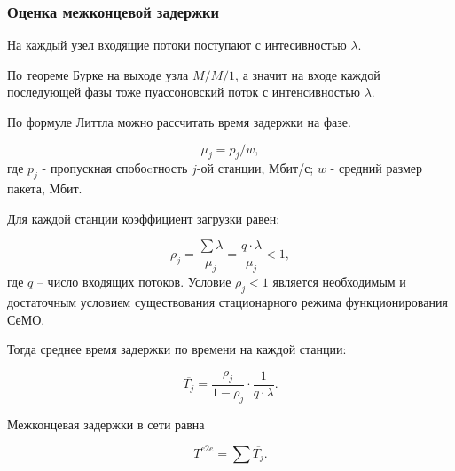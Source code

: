 \begin{frame}
    \justifying
    \frametitle{Оценка межконцевой задержки}
    \fontsize{8pt}{7.2}\selectfont

    На каждый узел входящие потоки поступают с интесивностью $\lambda$. 

    По теореме Бурке на выходе узла $M/M/1$, а значит на входе каждой последующей фазы тоже пуассоновский поток с интенсивностью $\lambda$.
    
    \bigskip

    По формуле Литтла можно рассчитать время задержки на фазе. 

    \begin{displaymath}
        \mu_j = p_j / w,
    \end{displaymath}
    где $p_j$ - пропускная спобоcтность $j$-ой станции, Мбит/с; $w$ - средний размер пакета, Мбит.

    Для каждой станции коэффициент загрузки равен:


    \begin{displaymath}
    \rho_j= \frac{\sum{\lambda}}{\mu_j} = \frac{q \cdot \lambda}{\mu_j} <1,
    \end{displaymath}
    где $q$ -- число входящих потоков. Условие $\rho_j<1$ является необходимым и достаточным условием существования стационарного режима функционирования СеМО.
    
    \bigskip
    
    Тогда среднее время задержки по времени на каждой станции:

    \begin{displaymath}
        \overline{T_j} = \frac{\rho_j}{1 - \rho_j} \cdot \frac{1}{q \cdot \lambda}.
    \end{displaymath}

    \bigskip

    Межконцевая задержки в сети равна

    \begin{equation}
        \label{eq:end_to_end_delay}
        T^{e2e}= \sum{\overline{T_j}}.
    \end{equation}

\end{frame}

